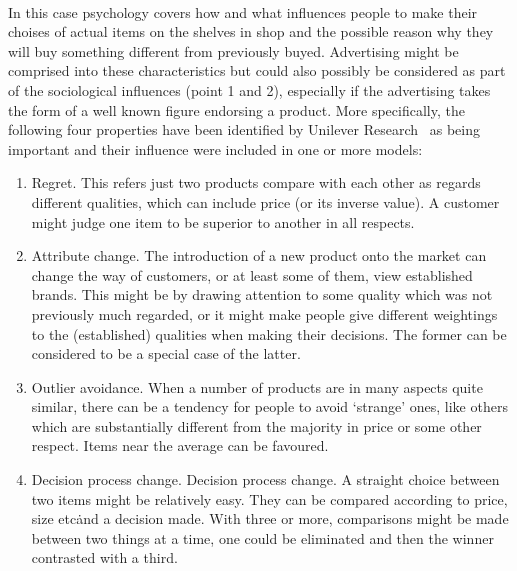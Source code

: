 \\
In this case psychology covers how and what influences people to make their choises of actual items on the shelves in
shop and the possible reason why they will buy something different from previously buyed.
Advertising might be comprised into these characteristics but could also possibly be considered as part of the sociological
influences (point 1 and 2), especially if the advertising takes the form of a well known figure endorsing a product.
More specifically, the following four properties have been identified by Unilever Research~\cite{patel} as being important and their influence were included in one or more models:

\begin{enumerate}
	\item Regret.
	This refers just two products compare with each other as regards different qualities, which can include price (or its inverse value).
	A customer might judge one item to be superior to another in all respects.
	\item Attribute change.
	The introduction of a new product onto the market can change the way of customers, or at least some of them, view established brands.
	This might be by drawing attention to some quality which was not previously much regarded, or it might make people give different
	weightings to the (established) qualities when making their decisions. The former can be considered to be a special case of the latter.
	\item Outlier avoidance.
	When a number of products are in many aspects quite similar, there can be a tendency for people to avoid ‘strange’ ones,
	like others which are substantially different from the majority in price or some other respect.
	Items near the average can be favoured.
	\item Decision process change.
	Decision process change.
	A straight choice between two items might be relatively easy.
	They can be compared according to price, size etc\. and a decision made. With three or more,
	comparisons might be made between two things at a time, one could be eliminated and then the winner contrasted with a third.
\end{enumerate}
